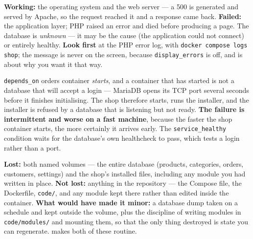 \begin{ans}
  \item \textbf{Working:} the operating system and the web server --- a 500 is
        generated and served by Apache, so the request reached it and a
        response came back. \textbf{Failed:} the application layer; PHP raised
        an error and died before producing a page. The database is
        \emph{unknown} --- it may be the cause (the application could not
        connect) or entirely healthy. \textbf{Look first} at the PHP error log,
        with \texttt{docker compose logs shop}; the message is never on the
        screen, because \texttt{display\_errors} is off, and 
        is about why you want it that way.
  \item \texttt{depends\_on} orders container \emph{starts}, and a container
        that has started is not a database that will accept a login --- MariaDB
        opens its TCP port several seconds before it finishes initialising. The
        shop therefore starts, runs the installer, and the installer is refused
        by a database that is listening but not ready. \textbf{The failure is
        intermittent and worse on a fast machine}, because the faster the shop
        container starts, the more certainly it arrives early. The
        \texttt{service\_healthy} condition waits for the database's own
        healthcheck to pass, which tests a login rather than a port.
  \item \textbf{Lost:} both named volumes --- the entire database (products,
        categories, orders, customers, settings) and the shop's installed
        files, including any module you had written in place. \textbf{Not
        lost:} anything in the repository --- the Compose file, the Dockerfile,
        \texttt{code/}, and any module kept there rather than edited inside the
        container. \textbf{What would have made it minor:} a database dump
        taken on a schedule and kept outside the volume, plus the discipline of
        writing modules in \texttt{code/modules/} and mounting them, so that
        the only thing destroyed is state you can regenerate. 
        makes both of these routine.
\end{ans}

